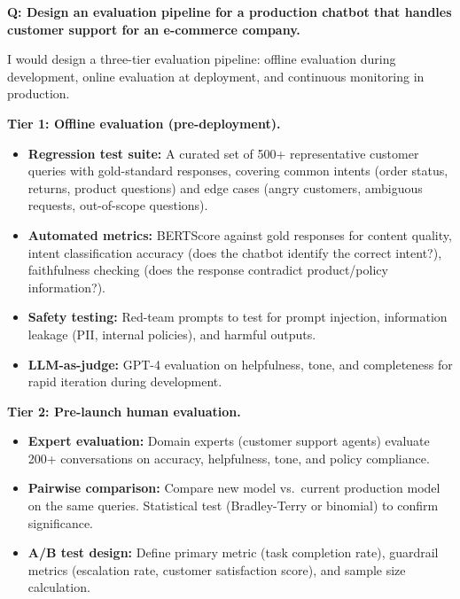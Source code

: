 \begin{interviewq}
\textbf{Q: Design an evaluation pipeline for a production chatbot that handles
customer support for an e-commerce company.}

 \quad {} \quad \badgefreq{\freqmed}

\stronganswer
I would design a three-tier evaluation pipeline: offline evaluation during
development, online evaluation at deployment, and continuous monitoring in
production.

\textbf{Tier 1: Offline evaluation (pre-deployment).}
\begin{itemize}
    \item \textbf{Regression test suite:} A curated set of 500+ representative
          customer queries with gold-standard responses, covering common intents
          (order status, returns, product questions) and edge cases (angry
          customers, ambiguous requests, out-of-scope questions).
    \item \textbf{Automated metrics:} BERTScore against gold responses for
          content quality, intent classification accuracy (does the chatbot
          identify the correct intent?), faithfulness checking (does the response
          contradict product/policy information?).
    \item \textbf{Safety testing:} Red-team prompts to test for prompt injection,
          information leakage (PII, internal policies), and harmful outputs.
    \item \textbf{LLM-as-judge:} GPT-4 evaluation on helpfulness, tone, and
          completeness for rapid iteration during development.
\end{itemize}

\textbf{Tier 2: Pre-launch human evaluation.}
\begin{itemize}
    \item \textbf{Expert evaluation:} Domain experts (customer support agents)
          evaluate 200+ conversations on accuracy, helpfulness, tone, and
          policy compliance.
    \item \textbf{Pairwise comparison:} Compare new model vs.\ current production
          model on the same queries.  Statistical test (Bradley-Terry or binomial)
          to confirm significance.
    \item \textbf{A/B test design:} Define primary metric (task completion rate),
          guardrail metrics (escalation rate, customer satisfaction score), and
          sample size calculation.
\end{itemize}


\end{interviewq}
